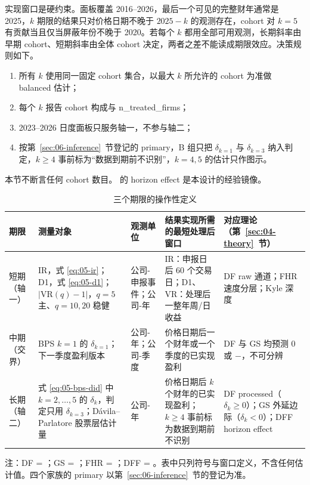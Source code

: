 \documentclass[a4paper,11pt]{ctexart}
\begin{document}
实现窗口是硬约束。面板覆盖 2016--2026，最后一个可见的完整财年通常是 2025，$k$ 期限的结果只对价格日期不晚于 $2025-k$ 的观测存在，cohort 对 $k=5$ 有贡献当且仅当屏蔽年份不晚于 2020。若每个 $k$ 都用全部可用观测，长期斜率由早期 cohort、短期斜率由全体 cohort 决定，两者之差不能读成期限效应。决策规则如下。
\begin{enumerate}[label=(\roman*)]
\item 所有 $k$ 使用同一固定 cohort 集合，以最大 $k$ 所允许的 cohort 为准做 balanced 估计；
\item 每个 $k$ 报告 cohort 构成与 n\_treated\_firms；
\item 2023--2026 日度面板只服务轴一，不参与轴二；
\item 按第~\ref{sec:06-inference}~节登记的 primary，B 组只把 $\delta_{k=1}$ 与 $\delta_{k=3}$ 纳入判定，$k\ge 4$ 事前标为“数据到期前不识别”，$k=4,5$ 的估计只作图示。
\end{enumerate}
本节不断言任何 cohort 数目。\citet{dessaintfoucaultfresard2024} 的 horizon effect 是本设计的经验镜像。

\begin{table}[htbp]
\centering
\caption{三个期限的操作性定义}\label{tab:05-horizons}
\begin{threeparttable}
\footnotesize
\begin{tabular}{@{}p{1.8cm}p{3.4cm}p{2.2cm}p{3.4cm}p{3.0cm}@{}}
\toprule
期限 & 测量对象 & 观测单位 & 结果实现所需的最短处理后窗口 & 对应理论（第~\ref{sec:04-theory}~节） \\
\midrule
短期（轴一） & IR，式 \eqref{eq:05-ir}；D1，式 \eqref{eq:05-d1}；$\lvert\mathrm{VR}(q)-1\rvert$，$q=5$ 主、$q=10,20$ 稳健 & 公司-申报事件；公司-年 & IR：申报日后 60 个交易日；D1、VR：处理后一整年周/日收益 & DF raw 通道；FHR 速度分层；Kyle 深度 \\
中期（交界） & BPS $k=1$ 的 $\delta_{k=1}$；下一季度盈利版本 & 公司-年；公司-季度 & 价格日期后一个财年或一个季度的已实现盈利 & DF 与 GS 均预测 0 或 $-$，不可分辨 \\
长期（轴二） & 式 \eqref{eq:05-bps-did} 中 $k=2,\dots,5$ 的 $\delta_k$，判定只用 $\delta_{k=3}$；Dávila--Parlatore 股票层估计量 & 公司-年 & 价格日期后 $k$ 个财年的已实现盈利；$k\ge4$ 事前标为数据到期前不识别 & DF processed（$\delta_k\ge0$）；GS 外延边际（$\delta_k<0$）；DFF horizon effect \\
\bottomrule
\end{tabular}
\begin{tablenotes}
\item 注：DF = \citet{dugastfoucault2018}；GS = \citet{grossmanstiglitz1980}；FHR = \citet{foucaulthombertrosu2016}；DFF = \citet{dessaintfoucaultfresard2024}。表中只列符号与窗口定义，不含任何估计值。四个家族的 primary 以第~\ref{sec:06-inference}~节的登记为准。
\end{tablenotes}
\end{threeparttable}
\end{table}
\end{document}
